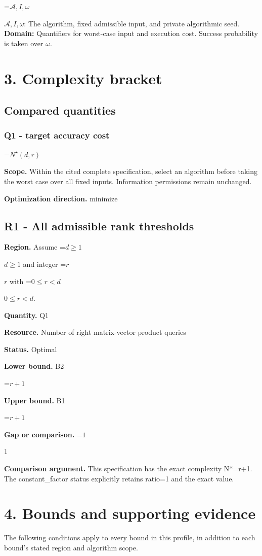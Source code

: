 \documentclass[10pt,a4paper]{article}
\newcommand{\AtlasMath}[1]{\par\begingroup\centering\setbox0=\hbox{$\displaystyle #1$}\ifdim\wd0>1.4\linewidth\typeout{ATLAS WIDE FORMULA: \the\wd0}\fi\ifdim\wd0>\linewidth\resizebox{\linewidth}{!}{\box0}\else\box0\fi\par\endgroup}
\newcommand{\AtlasInlineMath}[1]{\begingroup\setbox0=\hbox{$#1$}\ifdim\wd0>.4\linewidth\endgroup\AtlasMath{#1}\else\endgroup$#1$\fi}
\begin{document}
\AtlasInlineMath{\mathcal A,I,\omega}: The algorithm, fixed admissible input, and private algorithmic seed. \textbf{Domain:} Quantifiers for worst-case input and execution cost. Success probability is taken over $\omega$.

\section{3. Complexity bracket}
\subsection{Compared quantities}
\subsubsection{Q1 - target accuracy cost}
\AtlasMath{N^\star(d,r)}
\textbf{Scope.} Within the cited complete specification, select an algorithm before taking the worst case over all fixed inputs. Information permissions remain unchanged.

\textbf{Optimization direction.} minimize

\subsection{R1 - All admissible rank thresholds}
\textbf{Region.} Assume \AtlasInlineMath{d\ge1} and integer \AtlasInlineMath{r} with \AtlasInlineMath{0\le r<d}.

\textbf{Quantity.} Q1

\textbf{Resource.} Number of right matrix-vector product queries

\textbf{Status.} Optimal

\textbf{Lower bound.} B2

\AtlasMath{r+1}
\textbf{Upper bound.} B1

\AtlasMath{r+1}
\textbf{Gap or comparison.} \AtlasInlineMath{1}

\textbf{Comparison argument.} This specification has the exact complexity N*=r+1. The constant\_factor status explicitly retains ratio=1 and the exact value.

\section{4. Bounds and supporting evidence}
The following conditions apply to every bound in this profile, in addition to each bound's stated region and algorithm scope.
\end{document}
